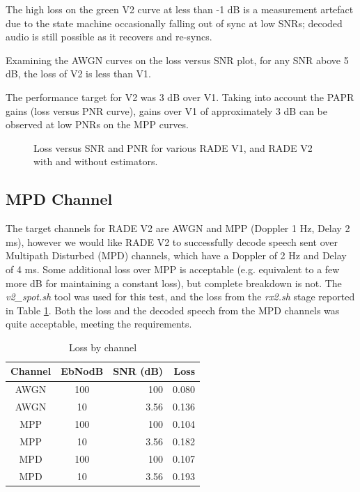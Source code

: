 \documentclass{article}
\begin{document}
The high loss on the green V2 curve at less than -1 \si{dB} is a measurement artefact due to the state machine occasionally falling out of sync at low SNRs; decoded audio is still possible as it recovers and re-syncs.

Examining the AWGN curves on the loss versus SNR plot, for any SNR above 5 \si{dB}, the loss of V2 is less than V1.

The performance target for V2 was 3 \si{dB} over V1. Taking into account the PAPR gains (loss versus PNR curve), gains over V1 of approximately 3 \si{dB} can be observed at low PNRs on the MPP curves.

\begin{figure}[h]
\caption{Loss versus SNR and PNR for various RADE V1, and RADE V2 with and without estimators.}
\label{fig:260203_inf_loss_SNR3k_models}
\begin{center}
\end{center}
\end{figure}

\subsection{MPD Channel}

The target channels for RADE V2 are AWGN and MPP (Doppler 1 \si{Hz}, Delay 2 \si{ms}), however we would like RADE V2 to successfully decode speech sent over Multipath Disturbed (MPD) channels, which have a Doppler of 2 \si{Hz} and Delay of 4 \si{ms}. Some additional loss over MPP is acceptable (e.g. equivalent to a few more \si{dB} for maintaining a constant loss), but complete breakdown is not.  The \emph{v2\_spot.sh} tool was used for this test, and the loss from the \emph{rx2.sh} stage reported in Table \ref{tab:loss_by_channel}.  Both the loss and the decoded speech from the MPD channels was quite acceptable, meeting the requirements.
 
\begin{table} [h]
\caption{Loss by channel}
\label{tab:loss_by_channel}
\centering
\begin{tabular}{ c | c | r | r }
 \hline
 Channel & EbNodB & SNR (\si{dB}) & Loss \\
 \hline
 AWGN & 100 & 100 & 0.080 \\
 AWGN & 10 & 3.56 & 0.136 \\
 MPP & 100 & 100 &  0.104\\
 MPP & 10 & 3.56 & 0.182 \\
 MPD & 100 & 100 & 0.107 \\
 MPD & 10 &  3.56 & 0.193 \\
 \hline
\end{tabular}
\end{table}
\end{document}
